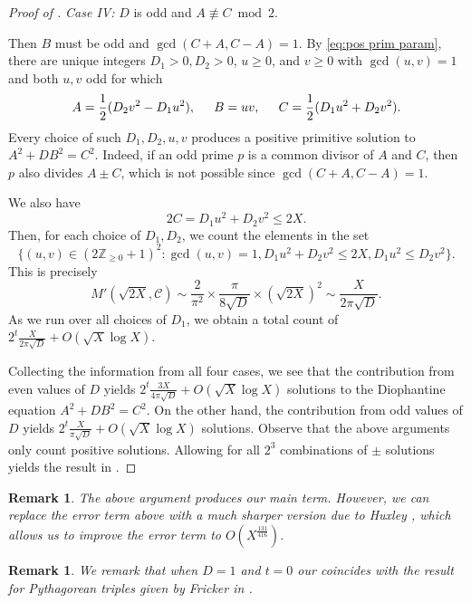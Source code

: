 \documentclass[12pt]{amsart}
\theoremstyle{plain}
\newtheorem{remark}[theorem]{Remark}
\begin{document}
\begin{proof}[Proof of ]
\vspace{10pt}
\noindent \emph{Case IV:} $D$ is odd and $A\not\equiv C\bmod2$.

Then $B$ must be odd and \(\gcd(C+A, C-A) = 1\). By \eqref{eq:pos prim param}, there are unique integers $D_1 > 0, D_2 >0$, $u \geq 0$, and $v \geq 0$ with $\gcd(u, v) = 1$ and both $u,v$ odd for which 
\[ A = \frac{1}{2}(D_2 v^2 - D_1 u^2), \hspace{0.2 in} B = uv, \hspace{0.2 in} C = \frac{1}{2}(D_1u^2 + D_2v^2).\]
Every choice of such $D_1, D_2, u, v$ produces a positive primitive solution to $A^2+DB^2=C^2$. Indeed, if an odd prime $p$ is a common divisor of $A$ and $C$, then $p$ also divides $A\pm C$, which is not possible since $\gcd(C+A, C-A) = 1$.

We also have
\[ 2C = D_1 u^2 + D_2 v^2 \leq 2X.\]
Then, for each choice of $D_1, D_2$, we count the elements in the set 
\[ \{(u, v)\in (2\mathbb{Z}_{\geq 0} + 1)^2: \gcd(u, v)=1, D_1u^2 + D_2v^2 \leq 2X, D_1u^2 \leq D_2v^2\}.\]
This is precisely 
\[ M'(\sqrt{2X}, \mathcal{C}) \sim \frac{2}{\pi^2} \times \frac{\pi}{8\sqrt{D}} \times (\sqrt{2X})^2 \sim \frac{X}{2 \pi \sqrt{D}}.\]
As we run over all choices of $D_1$, we obtain a total count of $2^t \frac{X}{2\pi\sqrt{D}} + O(\sqrt{X} \log X).$

\vspace{10pt}
Collecting the information from all four cases, we see that the contribution from even values of $D$ yields $2^t \frac{3X}{4\pi \sqrt{D}} + O(\sqrt{X} \log X)$ solutions to the Diophantine equation $A^2 + DB^2 = C^2$. On the other hand, the contribution from odd values of $D$ yields $2^t \frac{X}{\pi \sqrt{D}} + O(\sqrt{X} \log X)$ solutions. Observe that the above arguments only count positive solutions. Allowing for all $2^3$ combinations of $\pm$ solutions yields the result in .
\end{proof}

\begin{remark} The above argument produces our main term. However, we can replace the error term above with a much sharper version due to Huxley \cite{huxley}, which allows us to improve the error term to $O(X^{\frac{131}{416}})$. 
\end{remark}

\begin{remark} We remark that when $D = 1$ and $t = 0$ our  coincides with the result for Pythagorean triples given by Fricker in \cite{fricker}. 
\end{remark}
\end{document}
